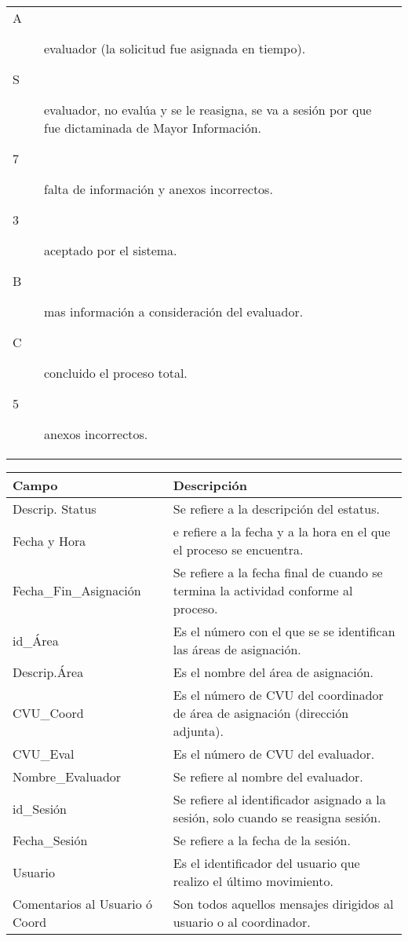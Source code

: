 \begin{tabular}{ m{} m{}  }
\begin{description}
                    \item[A] evaluador (la solicitud fue asignada en tiempo).
                    \item[S] evaluador, no evalúa y se le reasigna, se va a sesión por que fue dictaminada de Mayor Información.
                    \item[7] falta de información y anexos incorrectos.
                    \item[3] aceptado por el sistema.
                    \item[B] mas información a consideración del evaluador.
                    \item[C] concluido el proceso total.
                    \item[5] anexos incorrectos.
               \end{description}\\
\end{tabular}

\begin{tabular}{ m{} m{}  }%
	\rowcolor{gray1} {\bf Campo} &  {\bf Descripción} \\ \hline \hline
	\rowcolor{gray1}Descrip. Status & Se refiere a la descripción del estatus.\\
	Fecha y Hora & e refiere a la fecha y a la hora en el que el proceso se encuentra.\\
	\rowcolor{gray1}Fecha\_Fin\_Asignación &Se refiere a la fecha final de cuando se termina la actividad conforme al proceso.\\
	id\_Área & Es el número con el que se se identifican las áreas de asignación.\\
	\rowcolor{gray1}Descrip.Área & Es el nombre del área de asignación.\\
	CVU\_Coord & Es el número de CVU del coordinador de área de asignación (dirección adjunta).\\
	\rowcolor{gray1}CVU\_Eval & Es el número de CVU del evaluador.\\
	Nombre\_Evaluador & Se refiere al nombre del evaluador.\\
	\rowcolor{gray1}id\_Sesión & Se refiere al identificador asignado a la sesión, solo cuando se reasigna sesión.\\
	Fecha\_Sesión & Se refiere a la fecha de la sesión.\\
	\rowcolor{gray1}Usuario & Es el identificador del usuario que realizo el último movimiento.\\
	Comentarios al Usuario ó Coord & Son todos aquellos mensajes dirigidos al usuario o al coordinador.\\
\end{tabular}

